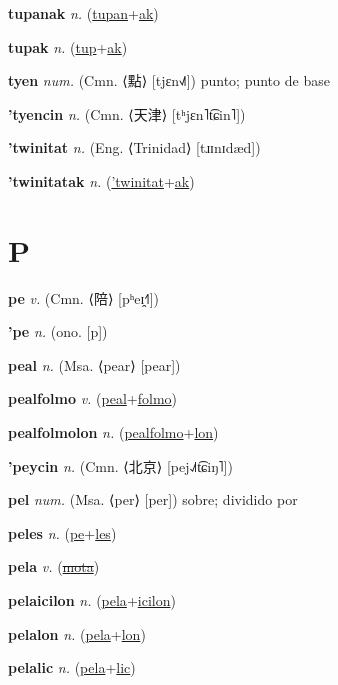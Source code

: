 \textbf{\hypertarget{tupanak}{tupanak}} \textit{n.} (\hyperlink{tupan}{tupan}+\allowbreak \hyperlink{ak}{ak})


\textbf{\hypertarget{tupak}{tupak}} \textit{n.} (\hyperlink{tup}{tup}+\allowbreak \hyperlink{ak}{ak})


\textbf{\hypertarget{tyen}{tyen}} \textit{num.} (Cmn. ⟨{\chinese{}點}⟩ [tjɛn˧˩˥])
punto; punto de base

\textbf{\hypertarget{'tyencin}{'tyencin}} \textit{n.} (Cmn. ⟨{\chinese{}天津}⟩ [tʰjɛn˥t͡ɕin˥])


\textbf{\hypertarget{'twinitat}{'twinitat}} \textit{n.} (Eng. ⟨Trinidad⟩ [tɹɪnɪdæd])


\textbf{\hypertarget{'twinitatak}{'twinitatak}} \textit{n.} (\hyperlink{'twinitat}{'twinitat}+\allowbreak \hyperlink{ak}{ak})


\section{P}

\textbf{\hypertarget{pe}{pe}} \textit{v.} (Cmn. ⟨{\chinese{}陪}⟩ [pʰeɪ̯˧˥])


\textbf{\hypertarget{'pe}{'pe}} \textit{n.} (ono. [p])


\textbf{\hypertarget{peal}{peal}} \textit{n.} (Msa. ⟨pear⟩ [pear])


\textbf{\hypertarget{pealfolmo}{pealfolmo}} \textit{v.} (\hyperlink{peal}{peal}+\allowbreak \hyperlink{folmo}{folmo})


\textbf{\hypertarget{pealfolmolon}{pealfolmolon}} \textit{n.} (\hyperlink{pealfolmo}{pealfolmo}+\allowbreak \hyperlink{lon}{lon})


\textbf{\hypertarget{'peycin}{'peycin}} \textit{n.} (Cmn. ⟨{\chinese{}北京}⟩ [pej˨˩˦t͡ɕiŋ˥])


\textbf{\hypertarget{pel}{pel}} \textit{num.} (Msa. ⟨per⟩ [per])
sobre; dividido por

\textbf{\hypertarget{peles}{peles}} \textit{n.} (\hyperlink{pe}{pe}+\allowbreak \hyperlink{les}{les})


\textbf{\hypertarget{pela}{pela}} \textit{v.} (\hyperlink{mota}{\sout{mota}})


\textbf{\hypertarget{pelaicilon}{pelaicilon}} \textit{n.} (\hyperlink{pela}{pela}+\allowbreak \hyperlink{icilon}{icilon})


\textbf{\hypertarget{pelalon}{pelalon}} \textit{n.} (\hyperlink{pela}{pela}+\allowbreak \hyperlink{lon}{lon})


\textbf{\hypertarget{pelalic}{pelalic}} \textit{n.} (\hyperlink{pela}{pela}+\allowbreak \hyperlink{lic}{lic})


